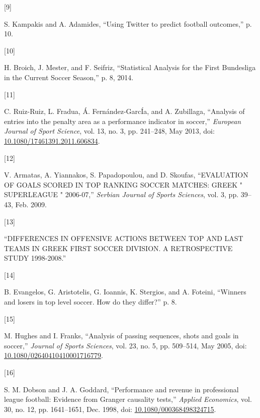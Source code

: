 \documentclass[
  english,
  doc,floatsintext]{apa6}
\newlength{\cslhangindent}
\newlength{\csllabelwidth}
\newlength{\cslentryspacingunit} %
\newenvironment{CSLReferences}[2] %
 {%
  \setlength{\parindent}{0pt}
  \ifodd #1
  \let\oldpar\par
  \def\par{\hangindent=\cslhangindent\oldpar}
  \fi
  \setlength{\parskip}{#2\cslentryspacingunit}
 }%
 {}
\newcommand{\CSLLeftMargin}[1]{\parbox[t]{\csllabelwidth}{#1}}
\newcommand{\CSLRightInline}[1]{\parbox[t]{\linewidth - \csllabelwidth}{#1}\break}
\begin{document}
\begin{CSLReferences}{0}{0}
\leavevmode{}%
\CSLLeftMargin{{[}9{]} }
\CSLRightInline{S. Kampakis and A. Adamides, {``Using {Twitter} to predict football outcomes,''} p. 10.}

\leavevmode{}%
\CSLLeftMargin{{[}10{]} }
\CSLRightInline{H. Broich, J. Mester, and F. Seifriz, {``Statistical {Analysis} for the {First Bundesliga} in the {Current Soccer Season},''} p. 8, 2014.}

\leavevmode{}%
\CSLLeftMargin{{[}11{]} }
\CSLRightInline{C. Ruiz-Ruiz, L. Fradua, Á. Fernández-GarcÍa, and A. Zubillaga, {``Analysis of entries into the penalty area as a performance indicator in soccer,''} \emph{European Journal of Sport Science}, vol. 13, no. 3, pp. 241--248, May 2013, doi: \href{https://doi.org/10.1080/17461391.2011.606834}{10.1080/17461391.2011.606834}.}

\leavevmode{}%
\CSLLeftMargin{{[}12{]} }
\CSLRightInline{V. Armatas, A. Yiannakos, S. Papadopoulou, and D. Skoufas, {``{EVALUATION OF GOALS SCORED IN TOP RANKING SOCCER MATCHES}: {GREEK} " {SUPERLEAGUE} " 2006-07,''} \emph{Serbian Journal of Sports Sciences}, vol. 3, pp. 39--43, Feb. 2009.}

\leavevmode{}%
\CSLLeftMargin{{[}13{]} }
\CSLRightInline{{``{DIFFERENCES IN OFFENSIVE ACTIONS BETWEEN TOP AND LAST TEAMS IN GREEK FIRST SOCCER DIVISION}. {A RETROSPECTIVE STUDY} 1998-2008.''}}

\leavevmode{}%
\CSLLeftMargin{{[}14{]} }
\CSLRightInline{B. Evangelos, G. Aristotelis, G. Ioannis, K. Stergios, and A. Foteini, {``Winners and losers in top level soccer. {How} do they differ?''} p. 8.}

\leavevmode{}%
\CSLLeftMargin{{[}15{]} }
\CSLRightInline{M. Hughes and I. Franks, {``Analysis of passing sequences, shots and goals in soccer,''} \emph{Journal of Sports Sciences}, vol. 23, no. 5, pp. 509--514, May 2005, doi: \href{https://doi.org/10.1080/02640410410001716779}{10.1080/02640410410001716779}.}

\leavevmode{}%
\CSLLeftMargin{{[}16{]} }
\CSLRightInline{S. M. Dobson and J. A. Goddard, {``Performance and revenue in professional league football: Evidence from {Granger} causality tests,''} \emph{Applied Economics}, vol. 30, no. 12, pp. 1641--1651, Dec. 1998, doi: \href{https://doi.org/10.1080/000368498324715}{10.1080/000368498324715}.}

\end{CSLReferences}


\clearpage
\renewcommand{\listfigurename}{Figure captions}
\listoffigures
\clearpage
\renewcommand{\listtablename}{Table captions}
\listoftables
\end{document}
